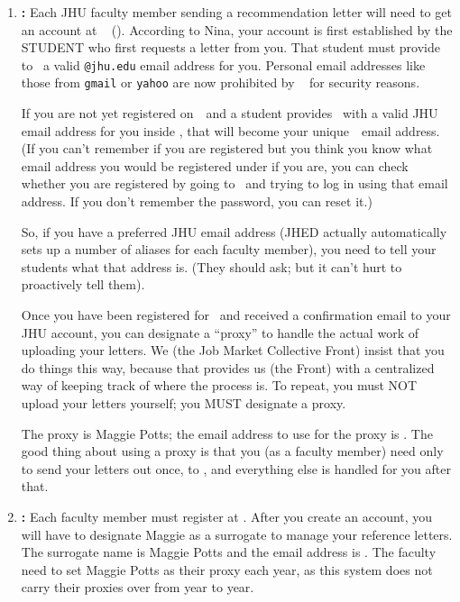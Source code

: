 \documentclass{econtex}
\begin{document}
\begin{enumerate}

\item {\bf \EJM:}
Each JHU faculty member sending a recommendation letter will need to
get an account at \EJM ~ (\EJMLink). According to Nina, your account is first established
by the STUDENT who first requests a letter from you.  That student must 
provide to \EJM~a valid \texttt{@jhu.edu} email address for you.  Personal email addresses like
those from \texttt{gmail} or \texttt{yahoo} are now prohibited by \EJM~
for security reasons.

If you are not yet registered on~\EJM~and a student provides \EJM~with
a valid JHU email address for you inside \EJM, that will become your
unique~\EJM~email address.  (If you can't remember if you are registered 
but you think you know what email address
you would be registered under if you are,  you can check whether you are
registered by going to \EJM~and trying to log in using that email
address.  If you don't remember the password, you can reset it.)  

So, if you have a preferred JHU email address (JHED actually automatically
sets up a number of aliases for each faculty member), you need to tell
your students what that address is.  (They should ask; but it can't
hurt to proactively tell them).

Once you have been registered for \EJM~and received a confirmation
email to your JHU account, you can designate a ``proxy'' to handle the
actual work of uploading your letters.  We (the Job Market Collective
Front) insist that you do things this way, because that provides us (the Front)
with a centralized way of keeping track of where the process is.  To
repeat, you must NOT upload your letters yourself; you MUST designate
a proxy.

The proxy is Maggie Potts; the email address to use for the proxy is
\JMStaffEmail.  The good thing about using a proxy is that you (as a faculty member)
need only to send your letters out once, to \JMStaffEmail, and everything 
else is handled for you after that.  

\begin{comment}
\textcolor{red}{
\item {\bf \AJO:}
Each JHU faculty member must register at \AJOLink~ and enter Maggie Potts as their proxy, using the
\JMStaffEmail~ email address. To do this, log in to your account and click on the `proxy' link near the bottom. This only needs to be done once and the proxy works for all applicants the faculty may have on the job market that year.}
\end{comment}

\item {\bf \AEA:}
Each faculty member must register at \AEARecLink. After you create an account, you will have to designate Maggie as a surrogate to manage your reference letters. The surrogate name is Maggie Potts and the email address is \JMStaffEmail. The faculty need to set Maggie Potts as their proxy each year, as this system does not carry their proxies over from year to year.

\end{enumerate}
\end{document}
